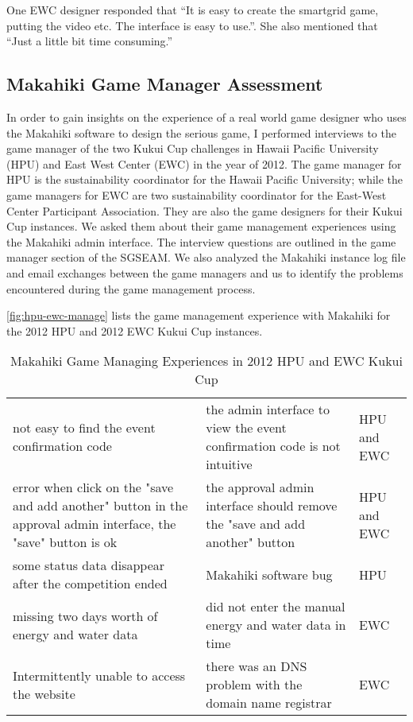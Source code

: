 One EWC designer responded that ``It is easy to create the smartgrid game, putting the video etc. The interface is easy to use.''. She also mentioned that ``Just a little bit time consuming.''

\subsection{Makahiki Game Manager Assessment}
In order to gain insights on the experience of a real world game designer who uses the Makahiki software to design the serious game, I performed interviews to the game manager of the two Kukui Cup challenges in Hawaii Pacific University (HPU) and East West Center (EWC) in the year of 2012. The game manager for HPU is the sustainability coordinator for the Hawaii Pacific University; while the game managers for EWC are two sustainability coordinator for the East-West Center Participant Association. They are also the game designers for their Kukui Cup instances. We asked them about their game management experiences using the Makahiki admin
interface. The interview questions are outlined in the game manager section of the SGSEAM. We also analyzed the Makahiki instance log file and email exchanges between the game managers and us to identify the problems encountered during the game management process.

\autoref{fig:hpu-ewc-manage} lists the game management experience with Makahiki for the 2012 HPU and 2012 EWC Kukui Cup instances. 

\begin{table}[ht!]
  \centering
  \begin{tabular}{|P{0.4\columnwidth}|P{0.4\columnwidth}|P{0.1\columnwidth}|}
    \hline
    \centering {} &
    \centering {} & 
     \\
    \hline
    not easy to find the event confirmation code  & the admin interface to view the event confirmation code is not intuitive & HPU and EWC \\
    \hline
    error when click on the "save and add another" button in the approval admin interface, the "save" button is ok &  the approval admin interface should remove the "save and add another" button & HPU and EWC \\
    \hline
    some status data disappear after the competition ended & Makahiki software bug & HPU\\
    \hline
    missing two days worth of energy and water data & did not enter the manual energy and water data in time & EWC\\
    \hline
    Intermittently unable to access the website  & there was an DNS problem with the domain name registrar & EWC\\
    \hline
  \end{tabular}
  \caption{Makahiki Game Managing Experiences in 2012 HPU and EWC Kukui Cup}
  \label{fig:hpu-ewc-manage}
\end{table}

